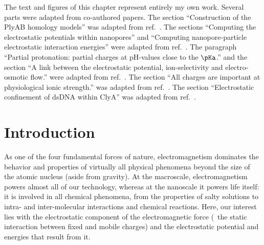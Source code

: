 %
The text and figures of this chapter represent entirely my own work. Several parts were adapted from
co-authored papers.
%
The section
%
``Construction of the PlyAB homology models''
%
was adapted from ref.~\cite{Huang-2020}.
%
%
The sections
%
``Computing the electrostatic potentials within nanopores''
%
and
%
``Computing nanopore-particle electrostatic interaction energies''
%
were adapted from ref.~\cite{Willems-Ruic-Biesemans-2019}.
%
%
The paragraph
%
``Partial protonation: partial charges at pH-values close to the $\pKa$.''
%
and the section
%
``A link between the electrostatic potential, ion-selectivity and electro-osmotic flow.''
%
were adapted from ref.~\cite{Huang-2017}.
%
The section
%
``All charges are important at physiological ionic strength.''
%
was adapted from ref.~\cite{Franceschini-2016}.
%
%
The section
%
``Electrostatic confinement of {dsDNA} within {ClyA}''
%
was adapted from ref.~\cite{Bayoumi-2020}.
%

%
%
%
%





%
\section{Introduction}
%
\label{sec:elec:intro}
%

As one of the four fundamental forces of nature, electromagnetism dominates the behavior and properties of
virtually all physical phenomena beyond the size of the atomic nucleus (aside from gravity). At the
macroscale, electromagnetism powers almost all of our technology, whereas at the nanoscale it powers life
itself: it is involved in all chemical phenomena, from the properties of salty solutions to intra- and
inter-molecular interactions and chemical reactions. Here, our interest lies with the electrostatic component
of the electromagnetic force (\ie~the static interaction between fixed and mobile charges) and the
electrostatic potential and energies that result from it.

